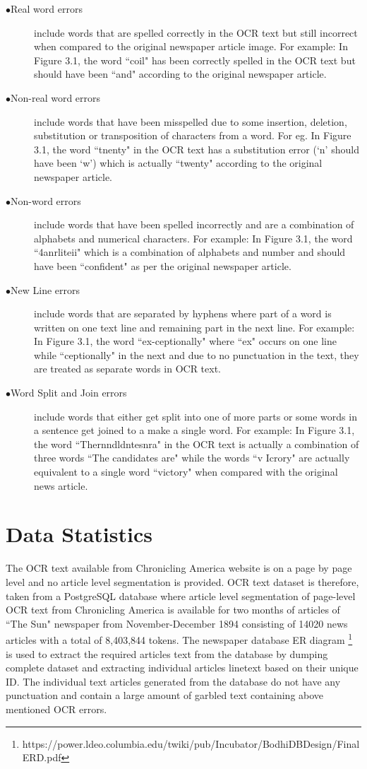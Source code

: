 \documentclass[letterpaper,11pt]{report}
\begin{document}
\begin{description}
 \item[$\bullet$Real word errors] include words that are spelled correctly in the OCR text but still incorrect when compared to the original newspaper article image. For example: In Figure 3.1, the word ``coil"  has been correctly spelled in the OCR text  but should have been ``and" according to the original newspaper article. 
 \item[$\bullet$Non-real word errors] include words that have been misspelled due to some insertion, deletion, substitution or transposition of characters from a word. For eg. In Figure 3.1, the word ``tnenty" in the OCR text has a substitution error (`n' should have been `w') which is actually ``twenty" according to the original newspaper article.
 \item[$\bullet$Non-word errors] include words that have been spelled incorrectly and are a combination of alphabets and numerical characters. For example: In Figure 3.1, the word ``4anrliteii" which is a combination of alphabets and number and should have been ``confident" as per the original newspaper article.
\item[$\bullet$New Line errors] include words that are separated by hyphens where part of a word is written on one text line and remaining part in the next line. For example: In Figure 3.1, the word ``ex-ceptionally" where ``ex" occurs on one line while ``ceptionally" in the next and due to no punctuation in the text, they are treated as separate words in OCR text.
\item[$\bullet$Word Split and Join errors] include words that either get split into one of more parts or some words in a sentence get joined to a make a single word. For example: In Figure 3.1, the word ``Thernndldntesnra" in the OCR text is actually a combination of three words ``The candidates are" while the words ``v Icrory" are actually equivalent to a single word ``victory" when compared with the original news article.
\end{description} 

\section{Data Statistics}
The OCR text available from Chronicling America website is on a page by page level and no article level segmentation is provided. OCR text dataset is therefore, taken from a PostgreSQL database where article level segmentation of page-level OCR text from Chronicling America is available for two months of articles of ``The Sun" newspaper from November-December 1894 consisting of 14020 news articles with a total of 8,403,844 tokens. The newspaper database ER diagram \footnote{https://power.ldeo.columbia.edu/twiki/pub/Incubator/BodhiDBDesign/Final ERD.pdf }
is used to extract the required articles text from the database by dumping complete dataset and extracting individual articles linetext based on their unique ID. The individual text articles generated from the database do not have any punctuation and contain a large amount of garbled text containing above mentioned OCR errors.
\end{document}
